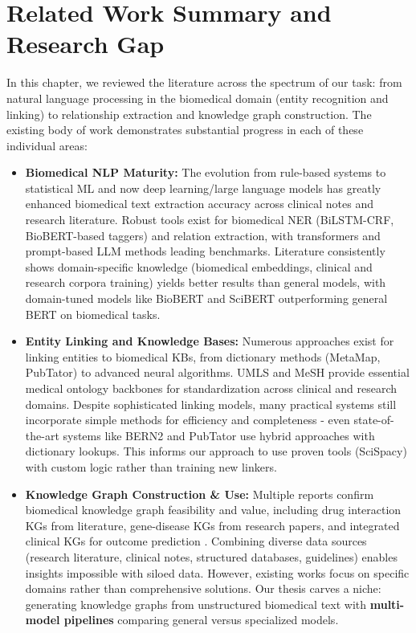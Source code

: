 \section{Related Work Summary and Research Gap}

In this chapter, we reviewed the literature across the spectrum of our task: from natural language processing in the biomedical domain (entity recognition and linking) to relationship extraction and knowledge graph construction. The existing body of work demonstrates substantial progress in each of these individual areas:

\begin{itemize}
\item \textbf{Biomedical NLP Maturity:} The evolution from rule-based systems to statistical ML and now deep learning/large language models has greatly enhanced biomedical text extraction accuracy across clinical notes and research literature. Robust tools exist for biomedical NER (BiLSTM-CRF, BioBERT-based taggers) and relation extraction, with transformers and prompt-based LLM methods leading benchmarks. Literature consistently shows domain-specific knowledge (biomedical embeddings, clinical and research corpora training) yields better results than general models, with domain-tuned models like BioBERT and SciBERT outperforming general BERT on biomedical tasks.

\item \textbf{Entity Linking and Knowledge Bases:} Numerous approaches exist for linking entities to biomedical KBs, from dictionary methods (MetaMap, PubTator) to advanced neural algorithms. UMLS and MeSH provide essential medical ontology backbones for standardization across clinical and research domains. Despite sophisticated linking models, many practical systems still incorporate simple methods for efficiency and completeness - even state-of-the-art systems like BERN2 and PubTator use hybrid approaches with dictionary lookups. This informs our approach to use proven tools (SciSpacy) with custom logic rather than training new linkers.

\item \textbf{Knowledge Graph Construction \& Use:} Multiple reports confirm biomedical knowledge graph feasibility and value, including drug interaction KGs from literature, gene-disease KGs from research papers, and integrated clinical KGs for outcome prediction \parencite{Rotmensch2017}. Combining diverse data sources (research literature, clinical notes, structured databases, guidelines) enables insights impossible with siloed data. However, existing works focus on specific domains rather than comprehensive solutions. Our thesis carves a niche: generating knowledge graphs from unstructured biomedical text with \textbf{multi-model pipelines} comparing general versus specialized models.
\end{itemize}

